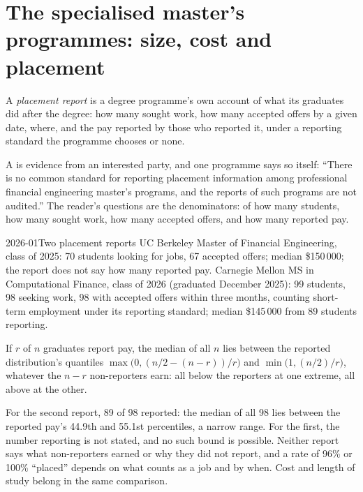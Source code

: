 \section{The specialised master's programmes: size, cost and placement}

\begin{definition}\label{def:in:education-pipelines:placement}
A \emph{placement report} is a degree programme's own account of what its graduates did after the
degree: how many sought work, how many accepted offers by a given date, where, and the pay reported by those who reported
it, under a reporting standard the programme chooses or none.
\end{definition}

A  is evidence from an interested party, and one programme says so itself: ``There is no common standard
for reporting placement information among professional financial engineering master's programs, and the reports of such
programs are not audited.'' The reader's questions are the denominators: of how many students, how many sought work, how
many accepted offers, and how many reported pay.

\begin{dated}{2026-01}{Two placement reports}\label{dat:in:education-pipelines:placement}
UC Berkeley Master of Financial Engineering, class of 2025: 70 students looking for jobs, 67 accepted offers; median  \$150\,000; the report does not say how many reported pay. Carnegie Mellon MS in Computational Finance, class of
2026 (graduated December 2025): 99 students, 98 seeking work, 98 with accepted offers within three months, counting
short-term employment under its reporting standard; median  \$145\,000 from 89 students reporting.
\end{dated}

\begin{method}\label{met:in:education-pipelines:bounds}
If $r$ of $n$ graduates report pay, the median of all $n$ lies between the reported distribution's quantiles
$\max\bigl(0,(n/2-(n-r))/r\bigr)$ and $\min\bigl(1,(n/2)/r\bigr)$, whatever the $n-r$ non-reporters earn: all below the
reporters at one extreme, all above at the other.
\end{method}

For the second report, 89 of 98 reported: the median of all 98 lies between the reported pay's 44.9th and 55.1st
percentiles, a narrow range. For the first, the number reporting is not stated, and no such bound is possible. Neither
report says what non-reporters earned or why they did not report, and a rate of 96\% or 100\% ``placed'' depends on what
counts as a job and by when. Cost and length of study belong in the same comparison.

